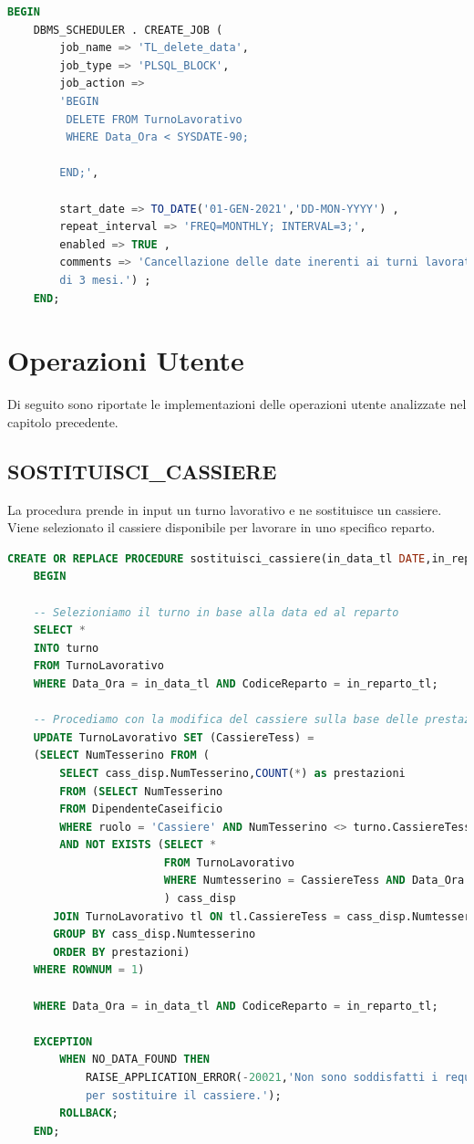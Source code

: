\documentclass[12pt]{report}
\begin{document}
\begin{lstlisting}[language=SQL,caption={SCHEDULER\_TL\_DELETE\_DATA}]
	BEGIN
	DBMS_SCHEDULER . CREATE_JOB (
		job_name => 'TL_delete_data',
		job_type => 'PLSQL_BLOCK',
		job_action => 
		'BEGIN
		 DELETE FROM TurnoLavorativo
		 WHERE Data_Ora < SYSDATE-90;
		
		END;',
		
		start_date => TO_DATE('01-GEN-2021','DD-MON-YYYY') ,
		repeat_interval => 'FREQ=MONTHLY; INTERVAL=3;',
		enabled => TRUE ,
		comments => 'Cancellazione delle date inerenti ai turni lavorativi vecchi 
		di 3 mesi.') ;
	END;
\end{lstlisting}

\newpage

\section{Operazioni Utente}

Di seguito sono riportate le implementazioni delle operazioni utente analizzate nel capitolo precedente.

\subsection*{SOSTITUISCI\_CASSIERE}
La procedura prende in input un turno lavorativo e ne sostituisce un cassiere. Viene selezionato il cassiere disponibile per lavorare in uno specifico reparto.

\begin{lstlisting}[language=SQL,caption={SOSTITUISCI\_CASSIERE}]
    CREATE OR REPLACE PROCEDURE sostituisci_cassiere(in_data_tl DATE,in_reparto_tl VARCHAR) IS turno TurnoLavorativo%ROWTYPE;
    BEGIN

    -- Selezioniamo il turno in base alla data ed al reparto
    SELECT *
    INTO turno
    FROM TurnoLavorativo
    WHERE Data_Ora = in_data_tl AND CodiceReparto = in_reparto_tl;
    
    -- Procediamo con la modifica del cassiere sulla base delle prestazioni effettuate
    UPDATE TurnoLavorativo SET (CassiereTess) = 
	(SELECT NumTesserino FROM (
	    SELECT cass_disp.NumTesserino,COUNT(*) as prestazioni
	    FROM (SELECT NumTesserino
	    FROM DipendenteCaseificio
	    WHERE ruolo = 'Cassiere' AND NumTesserino <> turno.CassiereTess
	    AND NOT EXISTS (SELECT * 
	                    FROM TurnoLavorativo 
	                    WHERE Numtesserino = CassiereTess AND Data_Ora = in_data_tl)
	                    ) cass_disp
	   JOIN TurnoLavorativo tl ON tl.CassiereTess = cass_disp.Numtesserino
	   GROUP BY cass_disp.Numtesserino
	   ORDER BY prestazioni)
	WHERE ROWNUM = 1)
	
	WHERE Data_Ora = in_data_tl AND CodiceReparto = in_reparto_tl;
	
	EXCEPTION
	    WHEN NO_DATA_FOUND THEN
	        RAISE_APPLICATION_ERROR(-20021,'Non sono soddisfatti i requisiti 
	        per sostituire il cassiere.');
		ROLLBACK;
    END;
\end{lstlisting}
\end{document}
